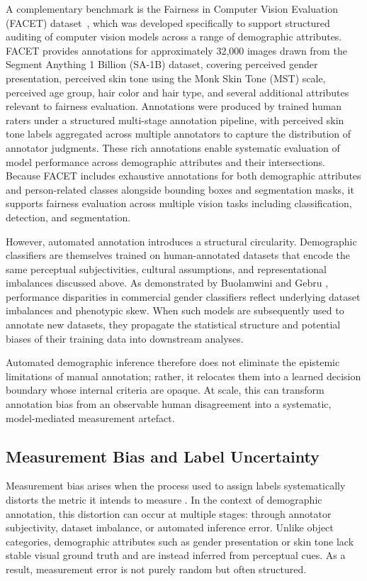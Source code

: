 A complementary benchmark is the Fairness in Computer Vision Evaluation
(FACET) dataset~\cite{Gustafson_2023_FACET}, which was developed specifically
to support structured auditing of computer vision models across a range of
demographic attributes. FACET provides annotations for approximately
32,000 images drawn from the Segment Anything 1 Billion (SA-1B) dataset,
covering perceived gender presentation, perceived skin tone using the Monk
Skin Tone (MST) scale, perceived age group, hair color and hair type, and
several additional attributes relevant to fairness evaluation. Annotations
were produced by trained human raters under a structured multi-stage
annotation pipeline, with perceived skin tone labels aggregated across
multiple annotators to capture the distribution of annotator judgments.
These rich annotations enable systematic evaluation of model performance
across demographic attributes and their intersections. Because FACET
includes exhaustive annotations for both demographic attributes and
person-related classes alongside bounding boxes and segmentation masks,
it supports fairness evaluation across multiple vision tasks including
classification, detection, and segmentation.

However, automated annotation introduces a structural circularity. Demographic classifiers are themselves trained on human-annotated datasets that encode the same perceptual subjectivities, cultural assumptions, and representational imbalances discussed above. As demonstrated by Buolamwini and Gebru \cite{Buolamwini_2018_GenderShades}, performance disparities in commercial gender classifiers reflect underlying dataset imbalances and phenotypic skew. When such models are subsequently used to annotate new datasets, they propagate the statistical structure and potential biases of their training data into downstream analyses.

Automated demographic inference therefore does not eliminate the epistemic limitations of manual annotation; rather, it relocates them into a learned decision boundary whose internal criteria are opaque. At scale, this can transform annotation bias from an observable human disagreement into a systematic, model-mediated measurement artefact.

\subsection{Measurement Bias and Label Uncertainty}

Measurement bias arises when the process used to assign labels systematically distorts the metric it intends to measure \cite{Mehrabi_2022_SurveyBiasFairnessMachine}. In the context of demographic annotation, this distortion can occur at multiple stages: through annotator subjectivity, dataset imbalance, or automated inference error. Unlike object categories, demographic attributes such as gender presentation or skin tone lack stable visual ground truth and are instead inferred from perceptual cues. As a result, measurement error is not purely random but often structured.

